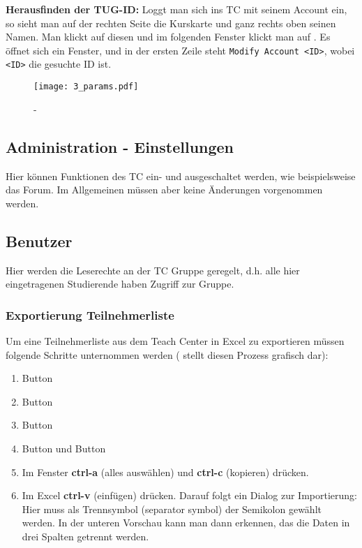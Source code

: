 {\bf Herausfinden der TUG-ID:} Loggt man sich ins TC mit seinem Account ein, so
sieht man auf der rechten Seite die Kurskarte und ganz rechts oben seinen Namen.
Man klickt auf diesen und im folgenden Fenster klickt man auf
. Es öffnet sich ein Fenster, und in der ersten Zeile
steht {\tt Modify Account \grqq{}<ID>\grqq{}}, wobei {\tt <ID>} die gesuchte
ID ist.

\begin{figure}[htbp]
\begin{center}
  \texttt{[image: 3\_params.pdf]}
  \caption{  -  }
  \label{fig:params}
\end{center}
\end{figure}

\subsection{Administration - Einstellungen}

Hier können Funktionen des TC ein- und ausgeschaltet werden, wie beispielsweise
das Forum. Im Allgemeinen müssen aber keine Änderungen vorgenommen werden.

\subsection{Benutzer}

Hier werden die Leserechte an der TC Gruppe geregelt, d.h. alle hier 
eingetragenen Studierende haben Zugriff zur Gruppe. 

\subsubsection{Exportierung Teilnehmerliste}

Um eine Teilnehmerliste aus dem Teach Center in Excel zu exportieren müssen
folgende Schritte unternommen werden ( stellt diesen
Prozess grafisch dar):

\begin{enumerate}
\item Button 
\item Button 
\item Button 
\item Button  und Button 
\item Im Fenster {\bf ctrl-a} (alles auswählen) und {\bf ctrl-c} (kopieren)
  drücken.
\item Im Excel {\bf ctrl-v} (einfügen) drücken. Darauf folgt ein Dialog zur
  Importierung: Hier muss als Trennsymbol (\glqq{}separator symbol\grqq{})
  der Semikolon gewählt werden. In der unteren Vorschau kann man dann erkennen,
  das die Daten in drei Spalten getrennt werden.
\end{enumerate}

